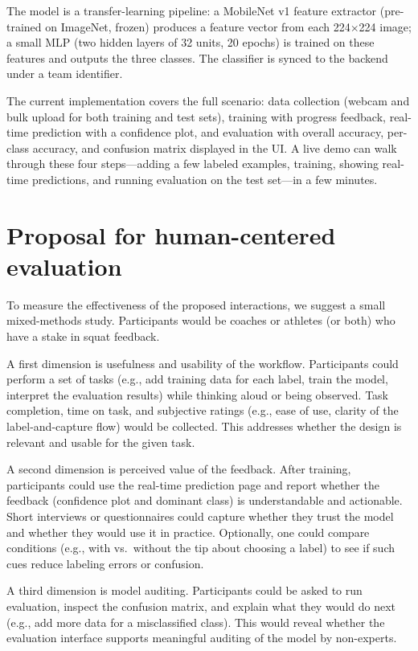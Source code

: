 \documentclass[10pt,twocolumn]{article}
\begin{document}
The model is a transfer-learning pipeline: a MobileNet v1 feature extractor (pre-trained on ImageNet, frozen) produces a feature vector from each 224$\times$224 image; a small MLP (two hidden layers of 32 units, 20 epochs) is trained on these features and outputs the three classes. The classifier is synced to the backend under a team identifier.

The current implementation covers the full scenario: data collection (webcam and bulk upload for both training and test sets), training with progress feedback, real-time prediction with a confidence plot, and evaluation with overall accuracy, per-class accuracy, and confusion matrix displayed in the UI. A live demo can walk through these four steps---adding a few labeled examples, training, showing real-time predictions, and running evaluation on the test set---in a few minutes.

\section{Proposal for human-centered evaluation}

To measure the effectiveness of the proposed interactions, we suggest a small mixed-methods study. Participants would be coaches or athletes (or both) who have a stake in squat feedback.

A first dimension is usefulness and usability of the workflow. Participants could perform a set of tasks (e.g., add training data for each label, train the model, interpret the evaluation results) while thinking aloud or being observed. Task completion, time on task, and subjective ratings (e.g., ease of use, clarity of the label-and-capture flow) would be collected. This addresses whether the design is relevant and usable for the given task.

A second dimension is perceived value of the feedback. After training, participants could use the real-time prediction page and report whether the feedback (confidence plot and dominant class) is understandable and actionable. Short interviews or questionnaires could capture whether they trust the model and whether they would use it in practice. Optionally, one could compare conditions (e.g., with vs.\ without the tip about choosing a label) to see if such cues reduce labeling errors or confusion.

A third dimension is model auditing. Participants could be asked to run evaluation, inspect the confusion matrix, and explain what they would do next (e.g., add more data for a misclassified class). This would reveal whether the evaluation interface supports meaningful auditing of the model by non-experts.
\end{document}
